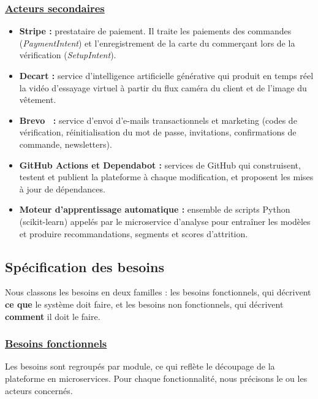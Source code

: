 \subsubsection*{\underline{\textbf{Acteurs secondaires}}}
\begin{itemize}[label=]
\item \textbf{Stripe :} prestataire de paiement. Il traite les paiements des commandes (\textit{PaymentIntent}) et l'enregistrement de la carte du commerçant lors de la vérification (\textit{SetupIntent}).
\item \textbf{Decart :} service d'intelligence artificielle générative qui produit en temps réel la vidéo d'essayage virtuel à partir du flux caméra du client et de l'image du vêtement.
\item \textbf{Brevo~\cite{brevo} :} service d'envoi d'e-mails transactionnels et marketing (codes de vérification, réinitialisation du mot de passe, invitations, confirmations de commande, newsletters).
\item \textbf{GitHub Actions et Dependabot :} services de GitHub qui construisent, testent et publient la plateforme à chaque modification, et proposent les mises à jour de dépendances.
\item \textbf{Moteur d'apprentissage automatique :} ensemble de scripts Python (scikit-learn) appelés par le microservice d'analyse pour entraîner les modèles et produire recommandations, segments et scores d'attrition.
\end{itemize}

\subsection{Spécification des besoins}
Nous classons les besoins en deux familles : les besoins fonctionnels, qui décrivent \textbf{ce que} le système doit faire, et les besoins non fonctionnels, qui décrivent \textbf{comment} il doit le faire.
\subsubsection*{\underline{\textbf{Besoins fonctionnels}}}
Les besoins sont regroupés par module, ce qui reflète le découpage de la plateforme en microservices. Pour chaque fonctionnalité, nous précisons le ou les acteurs concernés.

